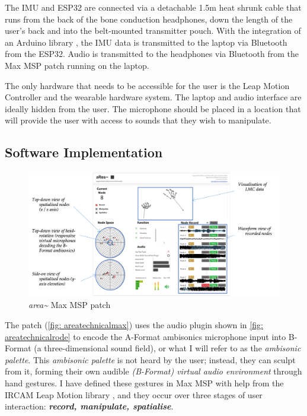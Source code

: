The IMU and ESP32 are connected via a detachable 1.5m heat shrunk cable that runs from the back of the bone conduction headphones, down the length of the user's back and into the belt-mounted transmitter pouch. With the integration of an Arduino library \citep{winer2016}, the IMU data is transmitted to the laptop via Bluetooth from the ESP32. Audio is transmitted to the headphones via Bluetooth from the Max MSP patch running on the laptop. 

The only hardware that needs to be accessible for the user is the Leap Motion Controller and the wearable hardware system. The laptop and audio interface are ideally hidden from the user. The microphone should be placed in a location that will provide the user with access to sounds that they wish to manipulate.

\subsection{Software Implementation}            \label{sec: area-system-software}

\begin{figure}
    \centering
    \includegraphics[width=\linewidth]{figures/05-area/areatechnical_max.png}
    \caption{\textit{area\textasciitilde{}} Max MSP patch}
    \label{fig: areatechnicalmax}
\end{figure}
The patch (\autoref{fig: areatechnicalmax}) uses the audio plugin \citep{rode2020} shown in \autoref{fig: areatechnicalrode} to encode the A-Format ambisonics microphone input into B-Format (a three-dimensional sound field), or what I will refer to as the \textit{ambisonic palette}. This \textit{ambisonic palette} is not heard by the user; instead, they can sculpt from it, forming their own audible \textit{(B-Format) virtual audio environment} through hand gestures. I have defined these gestures in Max MSP with help from the IRCAM Leap Motion library \citeyearpar{ircam2014}, and they occur over three stages of user interaction: \textit{\textbf{record, manipulate, spatialise}}. 

